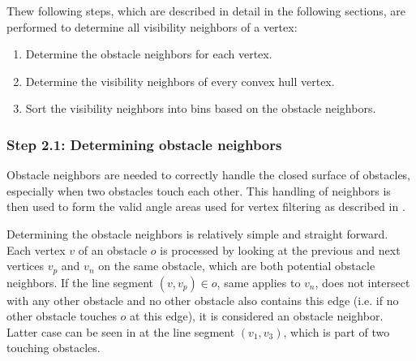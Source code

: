 			Thew following steps, which are described in detail in the following sections, are performed to determine all visibility neighbors of a vertex:
			\begin{enumerate}[leftmargin=2.25em+\widthof{2.},label={2.\arabic*.}]
				\item Determine the obstacle neighbors for each vertex.
				\item Determine the visibility neighbors of every convex hull vertex.
				\item Sort the visibility neighbors into bins based on the obstacle neighbors.
			\end{enumerate}
		
		\subsubsection{Step 2.1: Determining obstacle neighbors}
			
			Obstacle neighbors are needed to correctly handle the closed surface of obstacles, especially when two obstacles touch each other.
			This handling of neighbors is then used to form the valid angle areas used for vertex filtering as described in .
			
			Determining the obstacle neighbors is relatively simple and straight forward.
			Each vertex $v$ of an obstacle $o$ is processed by looking at the previous and next vertices $v_p$ and $v_n$ on the same obstacle, which are both potential obstacle neighbors.
			If the line segment $(v, v_p) \in o$, same applies to $v_n$, does not intersect with any other obstacle and no other obstacle also contains this edge (i.e. if no other obstacle touches $o$ at this edge), it is considered an obstacle neighbor.
			Latter case can be seen in  at the line segment $(v_1, v_3)$, which is part of two touching obstacles.
						
